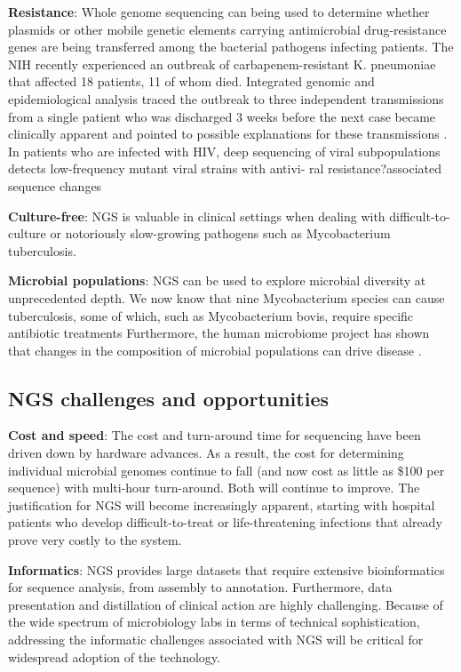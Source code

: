 \textbf{Resistance}: Whole genome sequencing can being used to determine whether plasmids or other mobile genetic elements carrying antimicrobial drug-resistance genes are being transferred among the bacterial pathogens infecting patients. The NIH recently experienced an outbreak of carbapenem-resistant K. pneumoniae that affected 18 patients, 11 of whom died. Integrated genomic and epidemiological analysis traced the outbreak to three independent transmissions from a single patient who was discharged 3 weeks before the next case became clinically apparent and pointed to possible explanations for these transmissions \cite{Fox:2014fj}. In patients who are infected with HIV, deep sequencing of viral subpopulations detects low-frequency mutant viral strains with antivi- ral resistance?associated sequence changes

\textbf{Culture-free}: NGS is valuable in clinical settings when dealing with difficult-to-culture or notoriously slow-growing pathogens such as Mycobacterium tuberculosis.

\textbf{Microbial populations}: NGS can be used to explore microbial diversity at unprecedented depth. We now know that nine Mycobacterium species can cause tuberculosis, some of which, such as Mycobacterium bovis, require specific antibiotic treatments \cite{Fox:2014fj} Furthermore, the human microbiome project has shown that changes in the composition of microbial populations can drive disease \cite{Consortium:2012bb}.

\subsection{NGS challenges and opportunities}

\textbf{Cost and speed}: The cost and turn-around time for sequencing have been driven down by hardware advances. As a result, the cost for determining individual microbial genomes continue to fall (and now cost as little as \$100 per sequence) \cite{Fox:2014fj} with multi-hour turn-around. Both will continue to improve. The justification for NGS will become increasingly apparent, starting with hospital patients who develop difficult-to-treat or life-threatening infections that already prove very costly to the system.

\textbf{Informatics}: NGS provides large datasets that require extensive bioinformatics for sequence analysis, from assembly to annotation. Furthermore, data presentation and distillation of clinical action are highly challenging. Because of the wide spectrum of microbiology labs in terms of technical sophistication, addressing the informatic challenges associated with NGS will be critical for widespread adoption of the technology.
 
